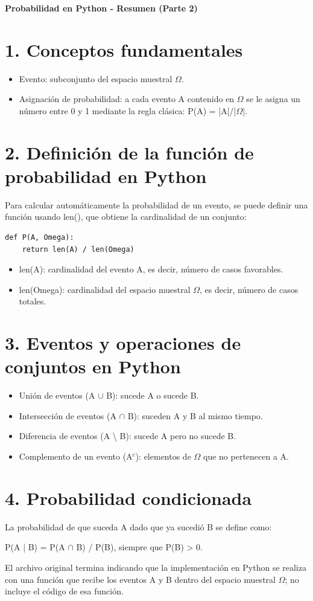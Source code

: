 \documentclass[10pt]{article}
\begin{document}
\begin{center}
{\Large\bfseries Probabilidad en Python - Resumen (Parte 2)}
\end{center}
\section*{1. Conceptos fundamentales}
\begin{itemize}
\item Evento: subconjunto del espacio muestral $\Omega$.
\item Asignación de probabilidad: a cada evento A contenido en $\Omega$ se le asigna un número entre 0 y 1 mediante la regla clásica: P(A) = |A|/|$\Omega$|.
\end{itemize}
\section*{2. Definición de la función de probabilidad en Python}
Para calcular automáticamente la probabilidad de un evento, se puede definir una función usando len(), que obtiene la cardinalidad de un conjunto:

\begin{verbatim}
def P(A, Omega):
    return len(A) / len(Omega)
\end{verbatim}
\begin{itemize}
\item len(A): cardinalidad del evento A, es decir, número de casos favorables.
\item len(Omega): cardinalidad del espacio muestral $\Omega$, es decir, número de casos totales.
\end{itemize}
\section*{3. Eventos y operaciones de conjuntos en Python}
\begin{itemize}
\item Unión de eventos (A $\cup$ B): sucede A o sucede B.
\item Intersección de eventos (A $\cap$ B): suceden A y B al mismo tiempo.
\item Diferencia de eventos (A \textbackslash{} B): sucede A pero no sucede B.
\item Complemento de un evento (A$^c$): elementos de $\Omega$ que no pertenecen a A.
\end{itemize}
\section*{4. Probabilidad condicionada}
La probabilidad de que suceda A dado que ya sucedió B se define como:

P(A | B) = P(A $\cap$ B) / P(B), siempre que P(B) > 0.

El archivo original termina indicando que la implementación en Python se realiza con una función que recibe los eventos A y B dentro del espacio muestral $\Omega$; no incluye el código de esa función.
\end{document}
